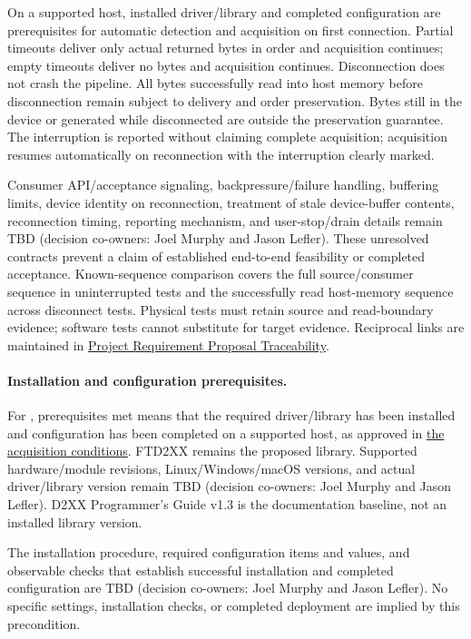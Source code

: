 On a supported host, installed driver/library and completed configuration
are prerequisites for automatic detection and acquisition on first connection.
Partial timeouts deliver only actual returned bytes in order and acquisition
continues; empty timeouts deliver no bytes and acquisition continues.
Disconnection does not crash the pipeline. All bytes successfully read into
host memory before disconnection remain subject to delivery and order
preservation. Bytes still in the device or generated while disconnected are
outside the preservation guarantee. The interruption is reported without
claiming complete acquisition; acquisition resumes automatically on
reconnection with the interruption clearly marked.

Consumer API/acceptance signaling, backpressure/failure handling, buffering
limits, device identity on reconnection, treatment of stale device-buffer
contents, reconnection timing, reporting mechanism, and user-stop/drain
details remain TBD (decision co-owners: Joel Murphy and Jason Lefler). These unresolved contracts
prevent a claim of established end-to-end feasibility or completed acceptance.
Known-sequence comparison covers the full source/consumer sequence in
uninterrupted tests and the successfully read host-memory sequence across
disconnect tests. Physical tests must retain source and read-boundary evidence;
software tests cannot substitute for target evidence.
Reciprocal links are maintained in
\hyperref[Table:ProjectRequirementTraceability]{Project Requirement Proposal Traceability}.


\paragraph{Installation and configuration prerequisites.}
\label{Section:ProjectStartupPrerequisites}
For , prerequisites met means that the required
driver/library has been installed and configuration has been completed on a
supported host, as approved in
\hyperref[Section:ProjectAcquisitionConditions]{the acquisition conditions}.
FTD2XX remains the proposed library. Supported hardware/module revisions,
Linux/Windows/macOS versions, and actual driver/library version remain TBD
(decision co-owners: Joel Murphy and Jason Lefler). D2XX Programmer's Guide v1.3 is the documentation
baseline, not an installed library version.

The installation procedure, required configuration items and values, and
observable checks that establish successful installation and completed
configuration are TBD (decision co-owners: Joel Murphy and Jason Lefler). No specific settings,
installation checks, or completed deployment are implied by this precondition.

